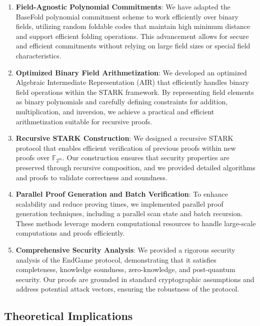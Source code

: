 \documentclass{article}
\theoremstyle{plain}
\theoremstyle{definition}
\theoremstyle{remark}
\theoremstyle{problem}
\begin{document}
\begin{enumerate}
    \item \textbf{Field-Agnostic Polynomial Commitments}: We have adapted the BaseFold polynomial commitment scheme to work efficiently over binary fields, utilizing random foldable codes that maintain high minimum distance and support efficient folding operations. This advancement allows for secure and efficient commitments without relying on large field sizes or special field characteristics.

    \item \textbf{Optimized Binary Field Arithmetization}: We developed an optimized Algebraic Intermediate Representation (AIR) that efficiently handles binary field operations within the STARK framework. By representing field elements as binary polynomials and carefully defining constraints for addition, multiplication, and inversion, we achieve a practical and efficient arithmetization suitable for recursive proofs.

    \item \textbf{Recursive STARK Construction}: We designed a recursive STARK protocol that enables efficient verification of previous proofs within new proofs over $\mathbb{F}_{2^m}$. Our construction ensures that security properties are preserved through recursive composition, and we provided detailed algorithms and proofs to validate correctness and soundness.

    \item \textbf{Parallel Proof Generation and Batch Verification}: To enhance scalability and reduce proving times, we implemented parallel proof generation techniques, including a parallel scan state and batch recursion. These methods leverage modern computational resources to handle large-scale computations and proofs efficiently.

    \item \textbf{Comprehensive Security Analysis}: We provided a rigorous security analysis of the EndGame protocol, demonstrating that it satisfies completeness, knowledge soundness, zero-knowledge, and post-quantum security. Our proofs are grounded in standard cryptographic assumptions and address potential attack vectors, ensuring the robustness of the protocol.
\end{enumerate}

\subsection{Theoretical Implications}
\end{document}
